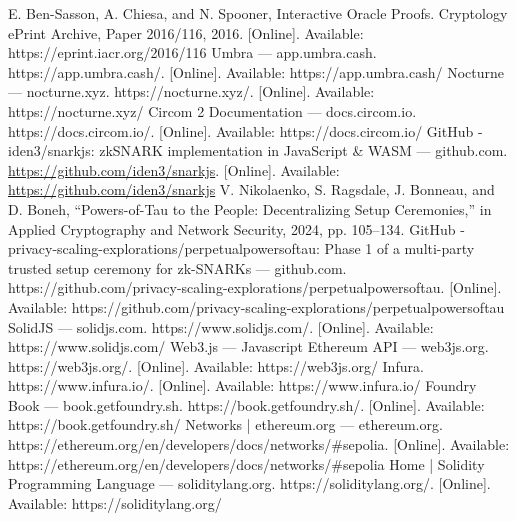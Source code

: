 \documentclass[conference,comsoc,10pt]{IEEEtran}
\begin{document}
\begin{thebibliography}{00}
     E. Ben-Sasson, A. Chiesa, and N. Spooner, Interactive Oracle Proofs. Cryptology ePrint Archive, Paper 2016/116, 2016. [Online]. Available: https://eprint.iacr.org/2016/116
     Umbra — app.umbra.cash. https://app.umbra.cash/. [Online]. Available: https://app.umbra.cash/
     Nocturne — nocturne.xyz. https://nocturne.xyz/. [Online]. Available: https://nocturne.xyz/
     Circom 2 Documentation — docs.circom.io. https://docs.circom.io/. [Online]. Available: https://docs.circom.io/
     GitHub - iden3/snarkjs: zkSNARK implementation in JavaScript \& WASM — github.com. \url{https://github.com/iden3/snarkjs}. [Online]. Available: \url{https://github.com/iden3/snarkjs}
     V. Nikolaenko, S. Ragsdale, J. Bonneau, and D. Boneh, “Powers-of-Tau to the People: Decentralizing Setup Ceremonies,” in Applied Cryptography and Network Security, 2024, pp. 105–134.
     GitHub - privacy-scaling-explorations/perpetualpowersoftau: Phase 1 of a multi-party trusted setup ceremony for zk-SNARKs — github.com. https://github.com/privacy-scaling-explorations/perpetualpowersoftau. [Online]. Available: https://github.com/privacy-scaling-explorations/perpetualpowersoftau
     SolidJS — solidjs.com. https://www.solidjs.com/. [Online]. Available: https://www.solidjs.com/
     Web3.js — Javascript Ethereum API — web3js.org. https://web3js.org/. [Online]. Available: https://web3js.org/
     Infura. https://www.infura.io/. [Online]. Available: https://www.infura.io/
     Foundry Book — book.getfoundry.sh. https://book.getfoundry.sh/. [Online]. Available: https://book.getfoundry.sh/
     Networks | ethereum.org — ethereum.org. https://ethereum.org/en/developers/docs/networks/#sepolia. [Online]. Available: https://ethereum.org/en/developers/docs/networks/#sepolia
     Home | Solidity Programming Language — soliditylang.org. https://soliditylang.org/. [Online]. Available: https://soliditylang.org/
\end{thebibliography}
\end{document}
